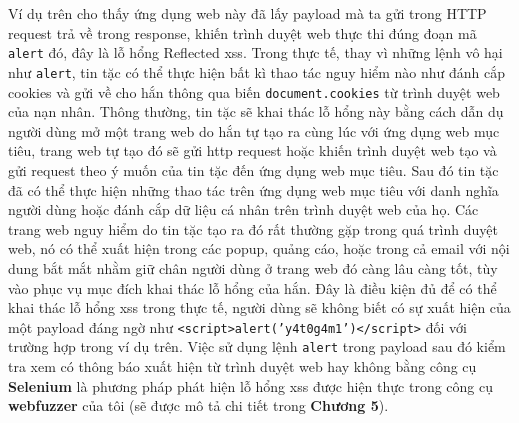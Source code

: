 Ví dụ trên cho thấy ứng dụng web này đã lấy payload mà ta gửi trong HTTP request trả về trong response, khiến trình duyệt web thực thi đúng đoạn mã \texttt{alert} đó, đây là lỗ hổng Reflected \acrshort{xss}. Trong thực tế, thay vì những lệnh vô hại như \texttt{alert}, tin tặc có thể thực hiện bất kì thao tác nguy hiểm nào như đánh cắp cookies và gửi về cho hắn thông qua biến \texttt{document.cookies} từ trình duyệt web của nạn nhân. Thông thường, tin tặc sẽ khai thác lỗ hổng này bằng cách dẫn dụ người dùng mở một trang web do hắn tự tạo ra cùng lúc với ứng dụng web mục tiêu, trang web tự tạo đó sẽ gửi \acrshort{http} request hoặc khiến trình duyệt web tạo và gửi request theo ý muốn của tin tặc đến ứng dụng web mục tiêu. Sau đó tin tặc đã có thể thực hiện những thao tác trên ứng dụng web mục tiêu với danh nghĩa người dùng hoặc đánh cắp dữ liệu cá nhân trên trình duyệt web của họ. Các trang web nguy hiểm do tin tặc tạo ra đó rất thường gặp trong quá trình duyệt web, nó có thể xuất hiện trong các popup, quảng cáo, hoặc trong cả email với nội dung bắt mắt nhằm giữ chân người dùng ở trang web đó càng lâu càng tốt, tùy vào phục vụ mục đích khai thác lỗ hổng của hắn. Đây là điều kiện đủ để có thể khai thác lỗ hổng \acrshort{xss} trong thực tế, người dùng sẽ không biết có sự xuất hiện của một payload đáng ngờ như \texttt{<script>alert('y4t0g4m1')</script>} đối với trường hợp trong ví dụ trên. Việc sử dụng lệnh \texttt{alert} trong payload sau đó kiểm tra xem có thông báo xuất hiện từ trình duyệt web hay không bằng công cụ \textbf{Selenium} là phương pháp phát hiện lỗ hổng \acrshort{xss} được hiện thực trong công cụ \textbf{webfuzzer} của tôi (sẽ được mô tả chi tiết trong \textbf{Chương 5}).

